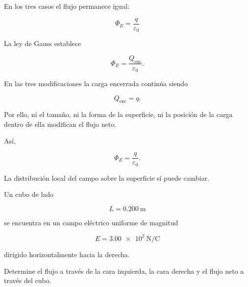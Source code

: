 \begin{respuesta}

En los tres casos el flujo permanece igual:

\[
\boxed{\Phi_E=\frac{q}{\varepsilon_0}}
\]

\end{respuesta}

\begin{explicacion}

La ley de Gauss establece

\[
\Phi_E=\frac{Q_{\text{enc}}}{\varepsilon_0}.
\]

En las tres modificaciones la carga encerrada continúa siendo

\[
Q_{\text{enc}}=q.
\]

Por ello, ni el tamaño, ni la forma de la superficie, ni la posición de la carga
dentro de ella modifican el flujo neto.

Así,

\[
\boxed{\Phi_E=\frac{q}{\varepsilon_0}}.
\]

La distribución local del campo sobre la superficie sí puede cambiar.

\end{explicacion}


\begin{ejercicio}

Un cubo de lado

\[
L=\SI{0.200}{\metre}
\]

se encuentra en un campo eléctrico uniforme de magnitud

\[
E=\SI{3.00e2}{\newton\per\coulomb}
\]

dirigido horizontalmente hacia la derecha.

\begin{center}
\end{center}

Determine el flujo a través de la cara izquierda, la cara derecha y el flujo neto
a través del cubo.

\end{ejercicio}

